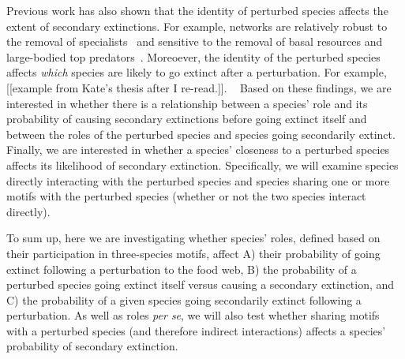 \documentclass[12pt]{article}
\begin{document}
	Previous work has also shown that the identity of perturbed species affects the extent of secondary extinctions. For example, networks are relatively robust to the removal of specialists~\citep{Srinivasan2007} and sensitive to the removal of basal resources and large-bodied top predators~\citep{Curtsdotter2011,Riede2011a}. Moreoever, the identity of the perturbed species affects \emph{which} species are likely to go extinct after a perturbation. For example, [[example from Kate's thesis after I re-read.]]. ~\citep{Wootton2016a} Based on these findings, we are interested in whether there is a relationship between a species' role and its probability of causing secondary extinctions before going extinct itself and between the roles of the perturbed species and species going secondarily extinct. Finally, we are interested in whether a species' closeness to a perturbed species affects its likelihood of secondary extinction. Specifically, we will examine species directly interacting with the perturbed species and species sharing one or more motifs with the perturbed species (whether or not the two species interact directly). 

	To sum up, here we are investigating whether species' roles, defined based on their participation in three-species motifs, affect A) their probability of going extinct following a perturbation to the food web, B) the probability of a perturbed species going extinct itself versus causing a secondary extinction, and C) the probability of a given species going secondarily extinct following a perturbation. As well as roles \emph{per se}, we will also test whether sharing motifs with a perturbed species (and therefore indirect interactions) affects a species' probability of secondary extinction.
\end{document}
